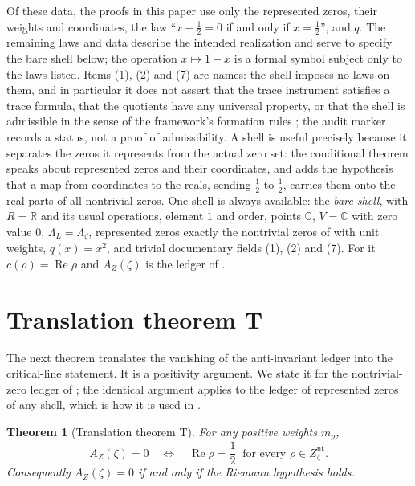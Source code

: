 \documentclass[11pt]{article}
\DeclareMathOperator{\Real}{Re}
\newcommand{\Lzeta}{\Lambda_{\zeta}}
\newcommand{\Znt}{Z_{\zeta}^{\mathrm{nt}}}
\newcommand{\AZ}{A_{Z}(\zeta)}
\newtheorem{theorem}{Theorem}[section]
\theoremstyle{definition}
\begin{document}
Of these data, the proofs in this paper use only the represented zeros,
their weights and coordinates, the law ``\(x-\frac12=0\) if and only if
\(x=\frac12\)'', and \(q\).  The remaining laws and data describe the
intended realization and serve to specify the bare shell below; the
operation \(x\mapsto1-x\) is a formal symbol subject only to the laws
listed.  Items (1), (2) and (7) are names: the shell imposes no laws on them, and in particular
it does not assert that the trace instrument satisfies a trace formula,
that the quotients have any universal property, or that the shell is
admissible in the sense of the framework's formation rules
\citep{TsiokosFoundationsII2026}; the audit marker records a status,
not a proof of admissibility.  A shell is useful precisely because it
separates the zeros it represents from the actual zero set: the conditional theorem speaks about represented zeros and their
coordinates, and  adds the hypothesis that a
map from coordinates to the reals, sending \(\frac12\) to \(\frac12\),
carries them onto the real parts of all nontrivial zeros.  One shell is always available: the \emph{bare shell}, with
\(R=\mathbb R\) and its usual operations, element \(1\) and order, points
\(\mathbb C\), \(V=\mathbb C\) with zero value \(0\), \(\Lambda_L=\Lzeta\),
represented zeros exactly the nontrivial zeros of
 with unit weights, \(q(x)=x^2\),
and trivial documentary fields (1), (2) and (7).  For it
\(c(\rho)=\Real\rho\) and \(\AZ\) is the ledger of
.
 \section{Translation theorem T}
\label{sec:translation_theorem}

The next theorem translates the vanishing of the anti-invariant ledger
into the critical-line statement.  It is a positivity argument.  We
state it for the nontrivial-zero ledger of
; the identical argument applies to
the ledger of represented zeros of any shell, which is how it is used
in .

\begin{theorem}[Translation theorem T]
\label{thm:rh:translation-T}
For any positive weights \(m_\rho\),
\[
  \AZ=0
  \quad\Longleftrightarrow\quad
  \Real\rho=\frac12\ \text{ for every }\rho\in\Znt .
\]
Consequently \(\AZ=0\) if and only if the Riemann hypothesis holds.
\end{theorem}
\end{document}

